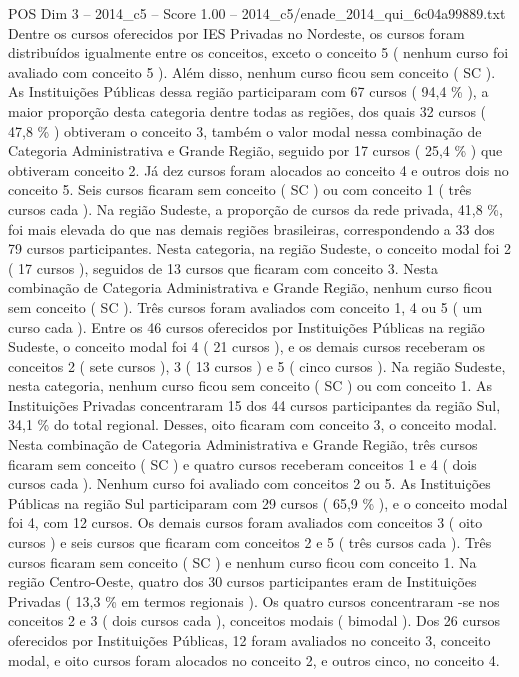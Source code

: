 \begin{textsample}{POS Dim 3 – 2014\_c5 – Score 1.00 – 2014\_c5/enade\_2014\_qui\_6c04a99889.txt}
Dentre os cursos oferecidos por IES Privadas no Nordeste, os cursos foram distribuídos igualmente entre os conceitos, exceto o conceito 5 ( nenhum curso foi avaliado com conceito 5 ).
Além disso, nenhum curso ficou sem conceito ( SC ).
As Instituições Públicas dessa região participaram com 67 cursos ( 94,4 \% ), a maior proporção desta categoria dentre todas as regiões, dos quais 32 cursos ( 47,8 \% ) obtiveram o conceito 3, também o valor modal nessa combinação de Categoria Administrativa e Grande Região, seguido por 17 cursos ( 25,4 \% ) que obtiveram conceito 2.
Já dez cursos foram alocados ao conceito 4 e outros dois no conceito 5.
Seis cursos ficaram sem conceito ( SC ) ou com conceito 1 ( três cursos cada ).
Na região Sudeste, a proporção de cursos da rede privada, 41,8 \%, foi mais elevada do que nas demais regiões brasileiras, correspondendo a 33 dos 79 cursos participantes.
Nesta categoria, na região Sudeste, o conceito modal foi 2 ( 17 cursos ), seguidos de 13 cursos que ficaram com conceito 3.
Nesta combinação de Categoria Administrativa e Grande Região, nenhum curso ficou sem conceito ( SC ).
Três cursos foram avaliados com conceito 1, 4 ou 5 ( um curso cada ).
Entre os 46 cursos oferecidos por Instituições Públicas na região Sudeste, o conceito modal foi 4 ( 21 cursos ), e os demais cursos receberam os conceitos 2 ( sete cursos ), 3 ( 13 cursos ) e 5 ( cinco cursos ).
Na região Sudeste, nesta categoria, nenhum curso ficou sem conceito ( SC ) ou com conceito 1.
As Instituições Privadas concentraram 15 dos 44 cursos participantes da região Sul, 34,1 \% do total regional.
Desses, oito ficaram com conceito 3, o conceito modal.
Nesta combinação de Categoria Administrativa e Grande Região, três cursos ficaram sem conceito ( SC ) e quatro cursos receberam conceitos 1 e 4 ( dois cursos cada ).
Nenhum curso foi avaliado com conceitos 2 ou 5.
As Instituições Públicas na região Sul participaram com 29 cursos ( 65,9 \% ), e o conceito modal foi 4, com 12 cursos.
Os demais cursos foram avaliados com conceitos 3 ( oito cursos ) e seis cursos que ficaram com conceitos 2 e 5 ( três cursos cada ).
Três cursos ficaram sem conceito ( SC ) e nenhum curso ficou com conceito 1.
Na região Centro-Oeste, quatro dos 30 cursos participantes eram de Instituições Privadas ( 13,3 \% em termos regionais ).
Os quatro cursos concentraram -se nos conceitos 2 e 3 ( dois cursos cada ), conceitos modais ( bimodal ).
Dos 26 cursos oferecidos por Instituições Públicas, 12 foram avaliados no conceito 3, conceito modal, e oito cursos foram alocados no conceito 2, e outros cinco, no conceito 4.

\end{textsample}

